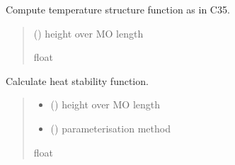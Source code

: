 \documentclass[letterpaper,10pt,english]{sphinxmanual}
\begin{document}
\begin{fulllineitems}

\pysigstartsignatures
{}
\pysigstopsignatures
\sphinxAtStartPar
Compute temperature structure function as in C35.
\begin{quote}\begin{description}
\sphinxAtStartPar
{} () \textendash{} height over MO length

\sphinxAtStartPar
{}

\sphinxAtStartPar
float

\end{description}\end{quote}

\end{fulllineitems}



\begin{fulllineitems}

\pysigstartsignatures
{}
\pysigstopsignatures
\sphinxAtStartPar
Calculate heat stability function.
\begin{quote}\begin{description}
\begin{itemize}
\item {} 
\sphinxAtStartPar
{} () \textendash{} height over MO length

\item {} 
\sphinxAtStartPar
{} () \textendash{} parameterisation method

\end{itemize}

\sphinxAtStartPar
{}

\sphinxAtStartPar
float

\end{description}\end{quote}

\end{fulllineitems}
\end{document}
